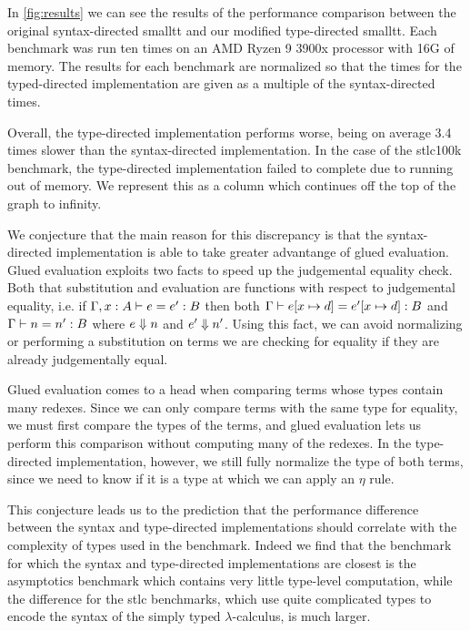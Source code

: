 In \autoref{fig:results} we can see the results of the performance comparison between the original syntax-directed smalltt and our modified type-directed smalltt.
Each benchmark was run ten times on an AMD Ryzen 9 3900x processor with 16G of memory.
The results for each benchmark are normalized so that the times for the typed-directed implementation are given as a multiple of the syntax-directed times.

Overall, the type-directed implementation performs worse, being on average 3.4 times slower than the syntax-directed implementation.
In the case of the stlc100k benchmark, the type-directed implementation failed to complete due to running out of memory.
We represent this as a column which continues off the top of the graph to infinity.

We conjecture that the main reason for this discrepancy is that the syntax-directed implementation is able to take greater advantange of glued evaluation.
Glued evaluation exploits two facts to speed up the judgemental equality check.
Both that substitution and evaluation are functions with respect to judgemental equality, i.e. if $\Gamma, x : A \vdash e = e' : B$ then both $\Gamma \vdash e [x \mapsto d] = e' [x \mapsto d] : B$ and $\Gamma \vdash n = n' : B$ where $e \Downarrow n$ and $e' \Downarrow n'$.
Using this fact, we can avoid normalizing or performing a substitution on terms we are checking for equality if they are already judgementally equal.

Glued evaluation comes to a head when comparing terms whose types contain many redexes.
Since we can only compare terms with the same type for equality, we must first compare the types of the terms, and glued evaluation lets us perform this comparison without computing many of the redexes.
In the type-directed implementation, however, we still fully normalize the type of both terms, since we need to know if it is a type at which we can apply an $\eta$ rule.

This conjecture leads us to the prediction that the performance difference between the syntax and type-directed implementations should correlate with the complexity of types used in the benchmark.
Indeed we find that the benchmark for which the syntax and type-directed implementations are closest is the asymptotics benchmark which contains very little type-level computation, while the difference for the stlc benchmarks, which use quite complicated types to encode the syntax of the simply typed $\lambda$-calculus, is much larger.

